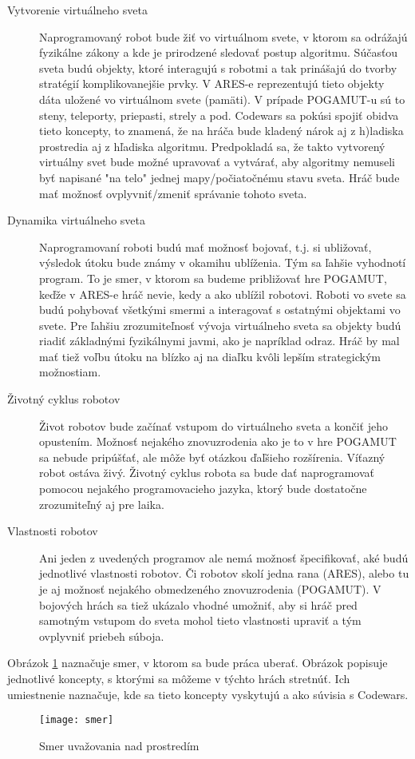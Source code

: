 \begin{description}
\item [Vytvorenie virtuálneho sveta]
Naprogramovaný robot bude žiť vo virtuálnom svete, v ktorom sa odrážajú fyzikálne zákony a kde je prirodzené sledovať postup algoritmu. Súčasťou sveta budú objekty, ktoré interagujú s robotmi a tak prinášajú do tvorby stratégií komplikovanejšie prvky. V ARES-e reprezentujú tieto objekty dáta uložené vo virtuálnom svete (pamäti). V prípade POGAMUT-u sú to steny, teleporty, priepasti, strely a pod. Codewars sa pokúsi spojiť obidva tieto koncepty, to znamená, že na hráča bude kladený nárok aj z h)ladiska prostredia aj z hľadiska algoritmu.
Predpokladá sa, že takto vytvorený virtuálny svet bude možné upravovať a vytvárať, aby algoritmy nemuseli byť napisané "na telo" jednej mapy/počiatočnému stavu sveta. Hráč bude mať možnosť ovplyvniť/zmeniť správanie tohoto sveta.
\item [Dynamika virtuálneho sveta] 
Naprogramovaní roboti budú mať možnosť bojovať,  t.j. si ubližovať, výsledok útoku bude známy v okamihu ublíženia. Tým sa ľahšie vyhodnotí program. To je smer, v ktorom sa budeme približovať hre POGAMUT, keďže v ARES-e hráč nevie, kedy a ako ublížil robotovi.
Roboti vo svete sa budú pohybovať všetkými smermi a interagovať s ostatnými objektami vo svete. Pre ľahšiu zrozumiteľnosť vývoja virtuálneho sveta sa objekty budú riadiť základnými fyzikálnymi javmi, ako je napríklad odraz. Hráč by mal mať tiež voľbu útoku na blízko aj na diaľku kvôli lepším strategickým možnostiam. %
\item [Životný cyklus robotov]
Život robotov bude začínať vstupom do virtuálneho sveta a končiť jeho opustením. Možnosť nejakého znovuzrodenia ako je to v hre POGAMUT sa nebude pripúšťať, ale môže byť otázkou ďaľšieho rozšírenia. Víťazný robot ostáva živý. Životný cyklus robota sa bude dať naprogramovať pomocou nejakého programovacieho jazyka, ktorý bude dostatočne zrozumiteľný aj pre laika. %
\item [Vlastnosti robotov] 
Ani jeden z uvedených programov ale nemá možnosť špecifikovať, aké budú jednotlivé  vlastnosti robotov. Či robotov skolí jedna rana (ARES),  alebo tu je aj možnosť nejakého obmedzeného znovuzrodenia (POGAMUT). V bojových  hrách sa tiež ukázalo vhodné umožniť, aby si hráč pred samotným vstupom do sveta mohol tieto vlastnosti upraviť a tým ovplyvniť priebeh súboja. %
\end{description}
Obrázok \ref{fig:smer} naznačuje smer, v ktorom sa bude práca uberať. Obrázok popisuje jednotlivé koncepty, s ktorými sa môžeme v týchto hrách stretnúť. Ich umiestnenie naznačuje, kde sa tieto koncepty vyskytujú a ako súvisia s Codewars.
\begin{figure}
\centering
\texttt{[image: smer]}
\caption{Smer uvažovania nad prostredím}
\label{fig:smer}
\end{figure}
